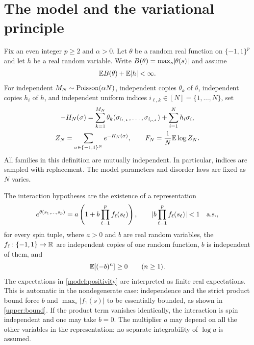 \section{The model and the variational principle}\label{model:section}

Fix an even integer $p\ge2$ and $\alpha>0$. Let $\theta$ be a random real
function on $\{-1,1\}^p$ and let $h$ be a real random variable. Write
$B(\theta)=\max_s\lvert\theta(s)\rvert$ and assume
\begin{equation}\label{model:integrability}
 \mathbb E B(\theta)+\mathbb E\lvert h\rvert<\infty.
\end{equation}
For independent $M_N\sim\operatorname{Poisson}(\alpha N)$, independent copies $\theta_k$ of
$\theta$, independent copies $h_i$ of $h$, and independent uniform indices
$i_{\ell,k}\in[N]=\{1,\ldots,N\}$, set
\begin{equation}\label{model:hamiltonian}
 \begin{gathered}
 -H_N(\sigma)=\sum_{k=1}^{M_N}
 \theta_k(\sigma_{i_{1,k}},\ldots,\sigma_{i_{p,k}})
 +\sum_{i=1}^N h_i\sigma_i,\\
 Z_N=\sum_{\sigma\in\{-1,1\}^N}e^{-H_N(\sigma)},
 \qquad F_N=\frac1N\mathbb E\log Z_N.
 \end{gathered}
\end{equation}
All families in this definition are mutually independent. In particular,
indices are sampled with replacement. The model parameters and disorder
laws are fixed as $N$ varies.

The interaction hypotheses are the existence of a representation
\begin{equation}\label{model:factorization}
 e^{\theta(s_1,\ldots,s_p)}
 =a\left(1+b\prod_{\ell=1}^p f_\ell(s_\ell)\right),
 \qquad
 \lvert b\prod_{\ell=1}^p f_\ell(s_\ell)\rvert<1\quad\text{a.s.},
\end{equation}
for every spin tuple, where $a>0$ and $b$ are real random variables,
the $f_\ell:\{-1,1\}\to\mathbb R$ are independent copies of one random
function, $b$ is independent of them, and
\begin{equation}\label{model:positivity}
 \mathbb E[(-b)^n]\ge0\qquad(n\ge1).
\end{equation}
The expectations in \eqref{model:positivity} are interpreted as finite real
expectations. This is automatic in the nondegenerate case: independence
and the strict product bound force $b$ and $\max_s|f_1(s)|$ to be
essentially bounded, as shown in \cref{upper:bound}. If the product term
vanishes identically, the interaction is spin independent and one may
take $b=0$. The multiplier $a$ may depend on all the other variables in
the representation; no separate integrability of $\log a$ is assumed.

